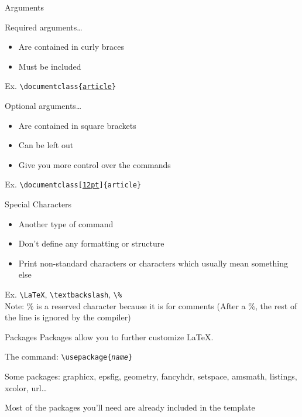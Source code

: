 \begin{frame}{Arguments}
\begin{block}{Required arguments\ldots}
\begin{itemize}
\item Are contained in curly braces
\item Must be included
\end{itemize}
Ex. \texttt{\textbackslash documentclass\{\underline{article}\}}
\end{block}
\begin{block}{Optional arguments\ldots}
\begin{itemize}
\item Are contained in square brackets
\item Can be left out
\item Give you more control over the commands
\end{itemize}
Ex. \texttt{\textbackslash documentclass[\underline{12pt}]\{article\}}
\end{block}
\end{frame}

\begin{frame}{Special Characters}
\begin{itemize}
\item Another type of command
\item Don't define any formatting or structure
\item Print non-standard characters or characters which usually mean something else
\end{itemize}
Ex. \texttt{\textbackslash LaTeX}, \texttt{\textbackslash textbackslash}, \texttt{\textbackslash \%} \\
Note: \% is a reserved character because it is for comments (After a \%, the rest of the line is ignored by the compiler) \\
\end{frame}


\begin{frame}{Packages}
Packages allow you to further customize \LaTeX.
\begin{block}{The command:}
\hspace{1cm}\texttt{\textbackslash usepackage\{\emph{name}\}}
\end{block}
\begin{block}{Some packages:}
graphicx, epsfig, geometry, fancyhdr, setspace, amsmath, listings, xcolor, url\ldots
\end{block}
Most of the packages you'll need are already included in the template
\end{frame}

